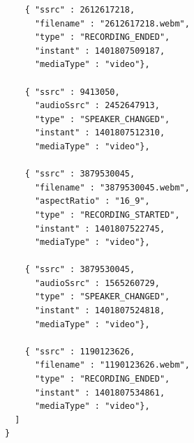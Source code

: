 \documentclass[twoside,openright,a4paper,12pt,english]{article}
\begin{document}
\begin{verbatim}
    { "ssrc" : 2612617218,
      "filename" : "2612617218.webm",
      "type" : "RECORDING_ENDED",
      "instant" : 1401807509187,
      "mediaType" : "video"},
      
    { "ssrc" : 9413050,
      "audioSsrc" : 2452647913,
      "type" : "SPEAKER_CHANGED",
      "instant" : 1401807512310,
      "mediaType" : "video"},
      
    { "ssrc" : 3879530045,
      "filename" : "3879530045.webm",
      "aspectRatio" : "16_9",
      "type" : "RECORDING_STARTED",
      "instant" : 1401807522745,
      "mediaType" : "video"},
      
    { "ssrc" : 3879530045,
      "audioSsrc" : 1565260729,
      "type" : "SPEAKER_CHANGED",
      "instant" : 1401807524818,
      "mediaType" : "video"},
      
    { "ssrc" : 1190123626,
      "filename" : "1190123626.webm",
      "type" : "RECORDING_ENDED",
      "instant" : 1401807534861,
      "mediaType" : "video"},
  ]
}
\end{verbatim}




\clearpage


\end{document}
